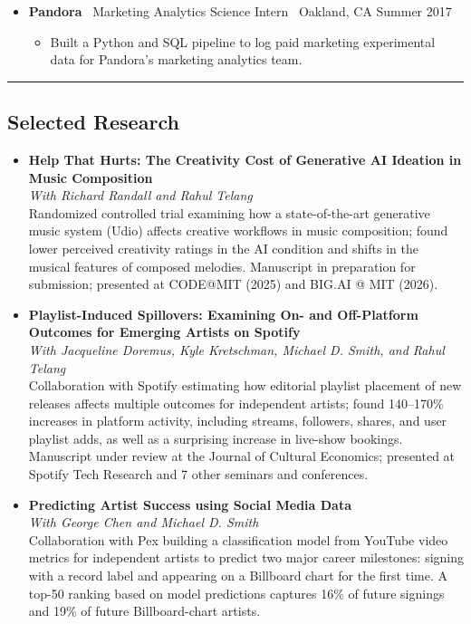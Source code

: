 \documentclass[10pt,letterpaper]{article}
\newcommand{\sep}{{\color{gray}\,\textbullet\,\,}}
\newcommand{\hsep}{\noindent\textcolor{gray}{\rule{\textwidth}{0.5pt}}}
\newcommand{\block}[1]{\begin{samepage}\hsep\subsection*{#1}\end{samepage}}
\begin{document}
\begin{itemize}[leftmargin=0pt, label={}, itemsep=4pt]
\begin{itemize}
  \item Delivered ad hoc analyses and reporting for senior and executive stakeholders to inform growth and retention decisions.
  \end{itemize}
\item \textbf{Pandora} \sep Marketing Analytics Science Intern \sep Oakland, CA \hfill Summer 2017
  \begin{itemize}
  \item Built a Python and SQL pipeline to log paid marketing experimental data for Pandora's marketing analytics team.
  \end{itemize}
\end{itemize}

\newpage

\block{Selected Research}

\begin{itemize}[leftmargin=0pt, label={}]
\item \textbf{Help That Hurts: The Creativity Cost of Generative AI Ideation in Music Composition}\\
\textit{With Richard Randall and Rahul Telang}\\
Randomized controlled trial examining how a state-of-the-art generative music system (Udio) affects creative workflows in music composition; found lower perceived creativity ratings in the AI condition and shifts in the musical features of composed melodies. Manuscript in preparation for submission; presented at CODE@MIT (2025) and BIG.AI @ MIT (2026).
\item \textbf{Playlist-Induced Spillovers: Examining On- and Off-Platform Outcomes for Emerging Artists on Spotify}\\
\textit{With Jacqueline Doremus, Kyle Kretschman, Michael D. Smith, and Rahul Telang}\\
Collaboration with Spotify estimating how editorial playlist placement of new releases affects multiple outcomes for independent artists; found 140--170\% increases in platform activity, including streams, followers, shares, and user playlist adds, as well as a surprising increase in live-show bookings. Manuscript under review at the Journal of Cultural Economics; presented at Spotify Tech Research and 7 other seminars and conferences.
\item \textbf{Predicting Artist Success using Social Media Data}\\
\textit{With George Chen and Michael D. Smith}\\
Collaboration with Pex building a classification model from YouTube video metrics for independent artists to predict two major career milestones: signing with a record label and appearing on a Billboard chart for the first time. A top-50 ranking based on model predictions captures 16\% of future signings and 19\% of future Billboard-chart artists.
\end{itemize}
\end{document}
